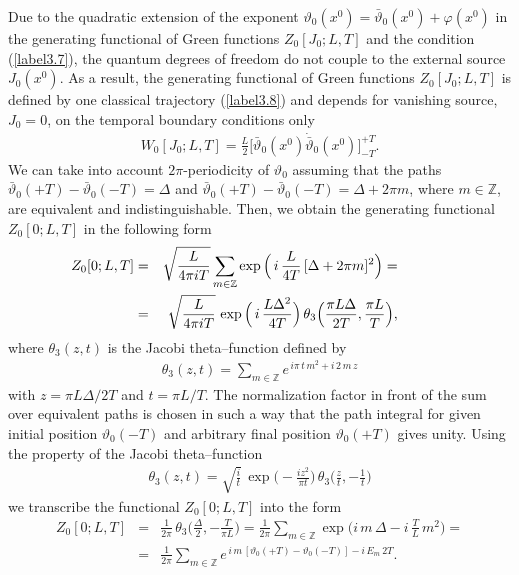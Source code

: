 \documentclass[a4paper,12pt] {article}
\begin{document}
Due to the quadratic extension of the exponent $\vartheta_0(x^0) =
\bar{\vartheta}_0(x^0) + \varphi(x^0)$ in the generating functional of
Green functions $Z_0[J_0; L,T]$ and the condition (\ref{label3.7}), the
quantum degrees of freedom do
not couple to the external source $J_0(x^0)$.  As a result, the
generating functional of Green functions $Z_0[J_0; L,T]$ is defined by
one classical trajectory (\ref{label3.8}) and depends for vanishing source,
$J_0=0$, on the temporal boundary conditions only
%
\begin{eqnarray}\label{label3.20}
W_0[J_0;L,T] =
\frac{L}{2}\Big[\bar{\vartheta}_0(x^0)
\dot{\bar{\vartheta}}_0(x^0)\Big]_{-T}^{+T}.
\end{eqnarray}
%
We can take into account $2\pi$-periodicity of $\vartheta_0$ assuming
that the paths $\bar{\vartheta}_0(+ T) - \bar{\vartheta}_0(-T) =
\Delta$ and $\bar{\vartheta}_0(+ T) - \bar{\vartheta}_0(-T) = \Delta +
2\pi m$, where $m \in \mathbb{Z}$, are equivalent and
indistinguishable. Then, we obtain the generating functional
$Z_0[0;L,T]$ in the following form
%
\begin{eqnarray}\label{label3.21}
\hspace{-0.5in}Z_0[0;L,T] &=& \sqrt{\frac{L}{4\pi i T}}\sum_{m\in
\mathbb{Z}}\exp\Big(\,i\,\frac{L}{4T}\,[\Delta + 2\pi m]^2\Big) =
\nonumber\\
\hspace{-0.5in}&=& \sqrt{\frac{L}{4\pi i T}}\,
\exp\Big(\,i\,\frac{L\Delta^2}{4T}\Big) \,\theta_3 \Big(\frac{\pi
L\Delta}{2T},\frac{\pi L}{T}\Big),
\end{eqnarray}
%
where $\theta_3(z,t)$ is the Jacobi theta--function defined by
\cite{SH81}
%
\begin{eqnarray}\label{label3.22}
\theta_3(z,t) = \sum_{m \in \mathbb{Z}}e^{\textstyle\,i\pi\,t\,m^2 +
i\,2\,m\,z}
\end{eqnarray}
%
with $z = \pi L\Delta/2T$ and $t = \pi L/T$.  The normalization factor
\cite{SH81} in front of the sum over equivalent paths is chosen in
such a way that the path integral for given initial position
$\vartheta_0(-T)$ and arbitrary final position $\vartheta_0(+T)$ gives
unity.  Using the property of the Jacobi theta--function
\cite{SH81}
%
\begin{eqnarray}\label{label3.23}
\theta_3(z,t) = \sqrt{\frac{i}{t}}\,\exp\Big(-\frac{iz^2}{\pi
t}\Big)\,\theta_3\Big(\frac{z}{t}, - \frac{1}{t}\Big)
\end{eqnarray}
%
we transcribe the functional $Z_0[0;L,T]$ into the form
%
\begin{eqnarray}\label{label3.24}
Z_0[0;L,T] &=& \frac{1}{2\pi}\,\theta_3\Big(\frac{\Delta}{2},-
\frac{T}{\pi L}\Big) = \frac{1}{2\pi}\sum_{m \in
\mathbb{Z}}\exp\Big(i\,m\,\Delta -
i\,\frac{T}{L}\,m^2\Big)=\nonumber\\ &=&\frac{1}{2\pi}\sum_{m \in
\mathbb{Z}}e^{\textstyle \,i\,m\,[\vartheta_0(+T) -
\vartheta_0(-T)] - i\,E_m\,2T}.
\end{eqnarray}
\end{document}
